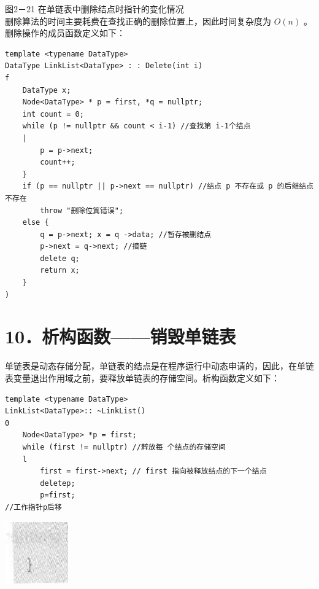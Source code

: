 \documentclass[10pt]{article}
\begin{document}
图2－21 在单链表中删除结点时指针的变化情况\\
删除算法的时间主要耗费在查找正确的删除位置上，因此时间复杂度为 $O(n)$ 。删除操作的成员函数定义如下：

\begin{verbatim}
template <typename DataType>
DataType LinkList<DataType> : : Delete(int i)
f
    DataType x;
    Node<DataType> * p = first, *q = nullptr;
    int count = 0;
    while (p != nullptr && count < i-1) //查找第 i-1个结点
    |
        p = p->next;
        count++;
    }
    if (p == nullptr || p->next == nullptr) //结点 p 不存在或 p 的后继结点不存在
        throw "删除位䈯错误";
    else {
        q = p->next; x = q ->data; //暂存被删结点
        p->next = q->next; //摘链
        delete q;
        return x;
    }
)
\end{verbatim}

\section*{10．析构函数——销毁单链表}
单链表是动态存储分配，单链表的结点是在程序运行中动态申请的，因此，在单链表变量退出作用域之前，要释放单链表的存储空间。析构函数定义如下：

\begin{verbatim}
template <typename DataType>
LinkList<DataType>:: ~LinkList()
0
    Node<DataType> *p = first;
    while (first != nullptr) //辢放每 个结点的存储空间
    l
        first = first->next; // first 指向被释放结点的下一个结点
        deletep;
        p=first;
//工作指针p后移
\end{verbatim}

\begin{center}
\includegraphics[max width=\textwidth]{2025_06_06_704745ea57b15b2333e5g-061}
\end{center}
\end{document}
